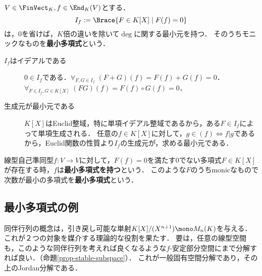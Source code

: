 \documentclass[uplatex, dvipdfmx]{jsreport}
\begin{document}
\begin{proposition}[有限次元線型空間の自己射は必ず最小多項式を持つ]\label{prop-existence-of-minimal-polynomial}
    $V\in\FinVect_K,f\in\End_K(V)$とする．
    \[I_f:=\Brace{F\in K[X]\mid F(f)=0}\]
    は，$0$を省けば，$K$倍の違いを除いて$\deg$に関する最小元を持つ．
    そのうちモニックなものを\textbf{最小多項式}という．
\end{proposition}
\begin{Proof}\mbox{}
    \begin{description}
        \item[$I_f$はイデアルである] $0\in I_f$である．$\forall_{F,G\in I_f}\;(F+G)(f)=F(f)+G(f)=0$．$\forall_{F\in I_f,G\in K[X]}\;(FG)(f)=F(f)\circ G(f)=0$．
        \item[生成元が最小元である] $K[X]$はEuclid整域，特に単項イデアル整域であるから，ある$F\in I_f$によって単項生成される．
        任意の$f\in K[X]$に対して，$g\in(f)\Leftrightarrow f|g$であるから，Euclid関数の性質より$I_f$の生成元が，求める最小元である．
    \end{description}
\end{Proof}

\begin{definition}
    線型自己準同型$f:V\to V$に対して，$F(f)=0$を満たす$0$でない多項式$F\in K[X]$が存在する時，$f$は\textbf{最小多項式を持つ}という．
    このような$F$のうちmonicなもので次数が最小の多項式を\textbf{最小多項式}という．
\end{definition}

\subsection{最小多項式の例}

\begin{tcolorbox}[colframe=ForestGreen, colback=ForestGreen!10!white, breakable]
    同伴行列の概念は，引き戻し可能な単射$K[X]/(X^{n+1})\mono M_n(K)$を与える．
    これが２つの対象を媒介する理論的な役割を果たす．
    要は，任意の線型空間も，このような同伴行列を考えれば良くなるような$f$-安定部分空間にまで分解すれば良い．（命題\ref{prop-stable-subspace}）．
    これが一般固有空間分解であり，その上のJordan分解である．
\end{tcolorbox}
\end{document}
